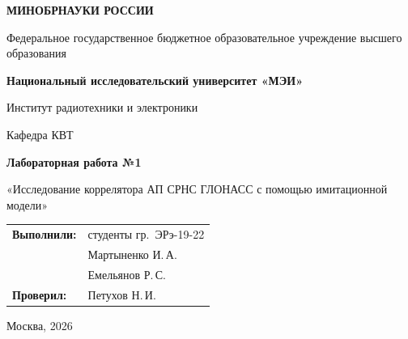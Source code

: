 \begin{titlepage}
    \centering
    {\bfseries МИНОБРНАУКИ РОССИИ\par}
    Федеральное государственное бюджетное образовательное учреждение высшего образования \\
    {\bfseries Национальный исследовательский университет «МЭИ»\par}
    \vspace{1cm}
    Институт радиотехники и электроники\par
    Кафедра КВТ\par
    \vspace{3cm}
    
    {\bfseries\large Лабораторная работа №1\par}
    \vspace{0.5cm}
    {\large «Исследование коррелятора АП СРНС ГЛОНАСС с помощью имитационной модели»\par}
    
    \vspace{3.5cm}
 \vspace{1.5cm}
\noindent\hfill
\begin{tabular}{@{}ll@{}}
    \textbf{Выполнили:} & студенты гр.~ЭРэ-19-22 \\
                        & Мартыненко И.\,А. \\
                        & Емельянов Р.\,С. \\
    \textbf{Проверил:}  & Петухов Н.\,И.
\end{tabular}   
    \vfill
    {Москва, 2026}
\end{titlepage}
